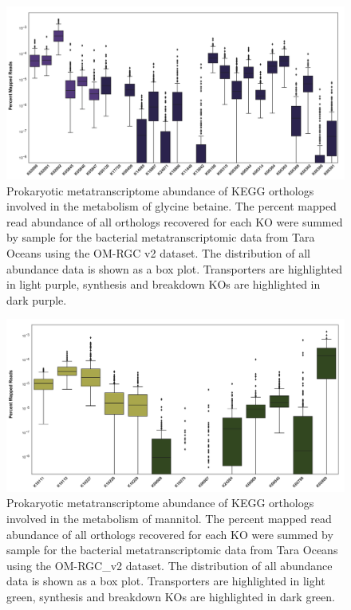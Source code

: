 \documentclass[utf8]{frontiers_suppmat} %
\begin{document}
\begin{figure}[ht]
    \centering
    \includegraphics[width=0.9\columnwidth]{Figures/SI-Bact_Glycine_betaine_distributions-01.png}
    \caption{Prokaryotic metatranscriptome abundance of KEGG orthologs involved in the metabolism of glycine betaine.  The percent mapped read abundance of all orthologs recovered for each KO were summed by sample for the bacterial metatranscriptomic data from Tara Oceans using the OM-RGC v2 dataset. The distribution of all abundance data is shown as a box plot. Transporters are highlighted in light purple, synthesis and breakdown KOs are highlighted in dark purple.}
    \label{fig:bact-GB}
\end{figure}

\begin{figure}[ht]
    \centering
    \includegraphics[width=0.9\columnwidth]{Figures/SI-Bact_Manitol_distributions-01.png}
    \caption{Prokaryotic metatranscriptome abundance of KEGG orthologs involved in the metabolism of mannitol.  The percent mapped read abundance of all orthologs recovered for each KO were summed by sample for the bacterial metatranscriptomic data from Tara Oceans using the OM-RGC\_v2 dataset. The distribution of all abundance data is shown as a box plot. Transporters are highlighted in light green, synthesis and breakdown KOs are highlighted in dark green.}
    \label{fig:bact-Man}
\end{figure}
\end{document}
